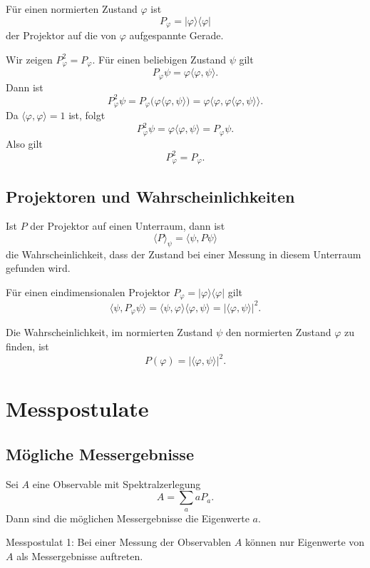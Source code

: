 Für einen normierten Zustand $\varphi$ ist
\[
    P_\varphi=|\varphi\rangle\langle\varphi|
\]
der Projektor auf die von $\varphi$ aufgespannte Gerade.

\begin{derivationbox}
Wir zeigen $P_\varphi^2=P_\varphi$. Für einen beliebigen Zustand $\psi$ gilt
\[
    P_\varphi\psi=\varphi\langle\varphi,\psi\rangle.
\]
Dann ist
\[
    P_\varphi^2\psi
    =P_\varphi\bigl(\varphi\langle\varphi,\psi\rangle\bigr)
    =\varphi\langle\varphi,\varphi\langle\varphi,\psi\rangle\rangle.
\]
Da $\langle\varphi,\varphi\rangle=1$ ist, folgt
\[
    P_\varphi^2\psi=\varphi\langle\varphi,\psi\rangle=P_\varphi\psi.
\]
Also gilt
\[
    P_\varphi^2=P_\varphi.
\]
\end{derivationbox}

\subsection{Projektoren und Wahrscheinlichkeiten}

Ist $P$ der Projektor auf einen Unterraum, dann ist
\[
    \langle P\rangle_\psi=\langle\psi,P\psi\rangle
\]
die Wahrscheinlichkeit, dass der Zustand bei einer Messung in diesem Unterraum gefunden wird.

Für einen eindimensionalen Projektor $P_\varphi=|\varphi\rangle\langle\varphi|$ gilt
\[
    \langle\psi,P_\varphi\psi\rangle
    =\langle\psi,\varphi\rangle\langle\varphi,\psi\rangle
    =|\langle\varphi,\psi\rangle|^2.
\]

\begin{formulabox}
Die Wahrscheinlichkeit, im normierten Zustand $\psi$ den normierten Zustand $\varphi$ zu finden, ist
\[
    P(\varphi)=|\langle\varphi,\psi\rangle|^2.
\]
\end{formulabox}

\section{Messpostulate}

\subsection{Mögliche Messergebnisse}

Sei $A$ eine Observable mit Spektralzerlegung
\[
    A=\sum_a a P_a.
\]
Dann sind die möglichen Messergebnisse die Eigenwerte $a$.

\begin{formulabox}
Messpostulat 1:
Bei einer Messung der Observablen $A$ können nur Eigenwerte von $A$ als Messergebnisse auftreten.
\end{formulabox}

